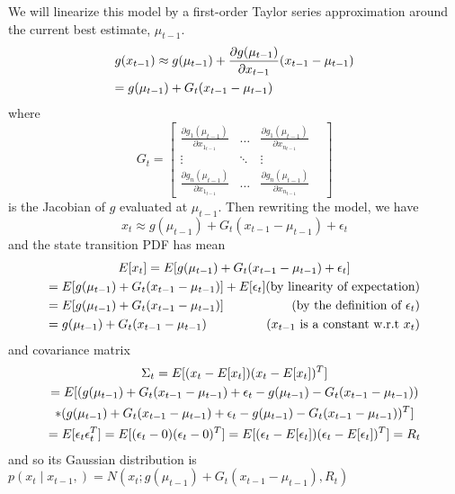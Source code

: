We will linearize this model by a first-order Taylor series approximation around the current best estimate, \(\mu_{t-1}\).
\begin{multline*}
g(x_{t-1}) \approx g(\mu_{t-1}) + \frac{\partial g(\mu_{t-1})}{\partial x_{t-1}} (x_{t-1} - \mu_{t-1}) \\
= g(\mu_{t-1}) + G_t (x_{t-1} - \mu_{t-1}) \hfill
\end{multline*}
where \[
G_t = \begin{bmatrix} 
\frac{\partial g_1(\mu_{t-1})}{\partial x_{1_{t-1}}} & \dots & \frac{\partial g_1(\mu_{t-1})}{\partial x_{n_{t-1}}}\\
\vdots & \ddots & \vdots & \\
\frac{\partial g_n(\mu_{t-1})}{\partial x_{1_{t-1}}} & \dots & \frac{\partial g_n(\mu_{t-1})}{\partial x_{n_{t-1}}} 
\end{bmatrix} \] is the Jacobian of \(g\) evaluated at \(\mu_{t-1}\). Then rewriting the model, we have
\begin{equation*}
x_t \approx g(\mu_{t-1}) + G_t (x_{t-1} - \mu_{t-1}) + \epsilon_t
\end{equation*}
and the state transition PDF has mean
\begin{multline*}
E[x_t] = E[g(\mu_{t-1}) + G_t (x_{t-1} - \mu_{t-1}) + \epsilon_t] \\
= E[g(\mu_{t-1}) + G_t (x_{t-1} - \mu_{t-1})] + E[\epsilon_t] \hfill \text{(by linearity of expectation)} \\
= E[g(\mu_{t-1}) + G_t (x_{t-1} - \mu_{t-1})] \hfill \text{(by the definition of \(\epsilon_t\))} \\
= g(\mu_{t-1}) + G_t (x_{t-1} - \mu_{t-1}) \hfill \text {(\(x_{t-1}\) is a constant w.r.t \(x_t\))}
\end{multline*}
and covariance matrix
\begin{multline*}
\Sigma_t = E[(x_t - E[x_t])(x_t - E[x_t])^T] \\ = E[(g(\mu_{t-1}) + G_t (x_{t-1} - \mu_{t-1}) + \epsilon_t - g(\mu_{t-1}) - G_t (x_{t-1} - \mu_{t-1})) \\
* (g(\mu_{t-1}) + G_t (x_{t-1} - \mu_{t-1}) + \epsilon_t - g(\mu_{t-1}) - G_t (x_{t-1} - \mu_{t-1}))^T] \\
= E[\epsilon_t \epsilon_t^T] = E[(\epsilon_t - 0)(\epsilon_t - 0)^T] = E[(\epsilon_t - E[\epsilon_t])(\epsilon_t - E[\epsilon_t])^T] = R_t \hfill
\end{multline*}
and so its Gaussian distribution is
\(p(x_t \mathbin{\vert} x_{t-1},) = N(x_t;g(\mu_{t-1}) + G_t (x_{t-1} - \mu_{t-1}),R_t)\)

